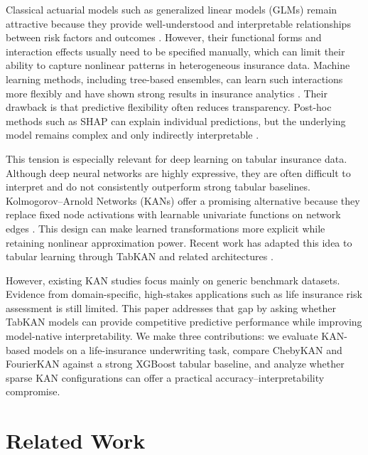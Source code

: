 \documentclass{article}
\begin{document}
Classical actuarial models such as generalized linear models (GLMs) remain attractive because they provide well-understood and interpretable relationships between risk factors and outcomes \cite{Frees2009}. However, their functional forms and interaction effects usually need to be specified manually, which can limit their ability to capture nonlinear patterns in heterogeneous insurance data. Machine learning methods, including tree-based ensembles, can learn such interactions more flexibly and have shown strong results in insurance analytics \cite{Henckaerts2021,Richman2021}. Their drawback is that predictive flexibility often reduces transparency. Post-hoc methods such as SHAP can explain individual predictions, but the underlying model remains complex and only indirectly interpretable \cite{LundbergLee2017,Aas2021}.

This tension is especially relevant for deep learning on tabular insurance data. Although deep neural networks are highly expressive, they are often difficult to interpret and do not consistently outperform strong tabular baselines. Kolmogorov--Arnold Networks (KANs) offer a promising alternative because they replace fixed node activations with learnable univariate functions on network edges \cite{Liu2024}. This design can make learned transformations more explicit while retaining nonlinear approximation power. Recent work has adapted this idea to tabular learning through TabKAN and related architectures \cite{Eslamian2025,Gao2024,Poeta2024}.

However, existing KAN studies focus mainly on generic benchmark datasets. Evidence from domain-specific, high-stakes applications such as life insurance risk assessment is still limited. This paper addresses that gap by asking whether TabKAN models can provide competitive predictive performance while improving model-native interpretability. We make three contributions: we evaluate KAN-based models on a life-insurance underwriting task, compare ChebyKAN and FourierKAN against a strong XGBoost tabular baseline, and analyze whether sparse KAN configurations can offer a practical accuracy--interpretability compromise.

\section{Related Work}
\label{sec:related}
\end{document}
